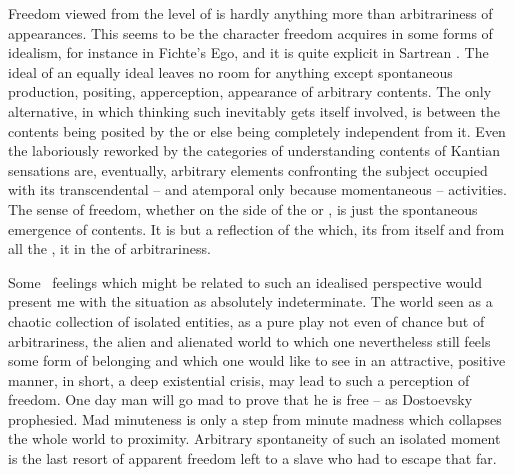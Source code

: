 \pa \imm %
Freedom viewed from the level of  is hardly anything
more than arbitrariness of appearances.  This seems to be the character freedom
acquires in some forms of idealism, for instance in Fichte's Ego, and it is
quite explicit in Sartrean .  The ideal  of an
equally ideal  leaves no room for anything except spontaneous
production, positing, apperception, appearance of arbitrary contents.  The only
alternative, in which thinking such  inevitably gets itself
involved, is between the contents being posited by the  or else
being completely independent from it.  Even the laboriously reworked by the
categories of understanding contents of Kantian sensations are, eventually,
arbitrary elements confronting the subject occupied with its transcendental --
and atemporal only because momentaneous -- activities.  The sense of freedom,
whether on the side of the  or , is just the spontaneous
emergence of contents. It is but a reflection of the  which,
 its  from itself and from all the ,
 it in the  of arbitrariness.

Some \oo\ feelings which might be related to such an idealised perspective would
present me with the  situation as absolutely indeterminate.
The world seen as a chaotic collection of isolated entities, as a pure play not
even of chance but of arbitrariness, the alien and alienated world to which one
nevertheless still feels some form of belonging and which one would like to see
in an attractive, positive manner, in short, a deep existential crisis, may lead
to such a perception of freedom.  One day man will go mad to prove that he
  is free -- as Dostoevsky prophesied.   Mad minuteness is only a step
from minute madness which collapses the whole world to  proximity.
Arbitrary spontaneity of such an isolated moment is the last resort of apparent
freedom left to a slave who had to escape that far.

